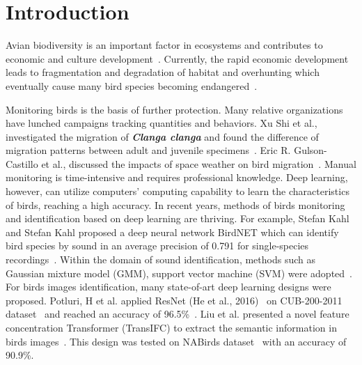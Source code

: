 \section{Introduction}
\newcommand{\textbi}[1]{\textit{\textbf{#1}}}
Avian biodiversity is an important factor 
in ecosystems and contributes to 
economic and culture development~\cite{bc1}. 
Currently, the rapid economic development leads to fragmentation and degradation of habitat and overhunting 
which eventually cause many bird species becoming endangered~\cite{bc1,bc2}. 

Monitoring birds is the basis of further protection.
Many relative organizations have lunched campaigns 
tracking quantities and behaviors. 
Xu Shi et al., investigated the migration of
\textbi{Clanga clanga} and found the difference of 
migration patterns between adult and juvenile specimens~\cite{bc3}.
Eric R. Gulson-Castillo et al., discussed the impacts 
of space weather on bird migration~\cite{bc4}.
Manual monitoring is time-intensive and requires professional knowledge.
Deep learning, however, can utilize computers' computing capability to learn the characteristics of birds, 
reaching a high accuracy.
In recent years, methods of birds monitoring and identification based on deep learning are 
thriving. For example, Stefan Kahl and Stefan Kahl  
proposed a deep neural network BirdNET which can 
identify bird species by sound in an average precision of 
0.791 for single-species recordings~\cite{sa1}.
Within the domain of sound identification, methods
such as Gaussian mixture model (GMM),  support vector machine (SVM)
were adopted~\cite{sa2,sa3}. For birds images identification, many state-of-art deep learning designs
were proposed. Potluri, H et al. applied ResNet (He et al., 2016)~\cite{resnet} on 
CUB-200-2011 dataset~\cite{dataset1} and reached an accuracy of 96.5\%~\cite{sa4}.
Liu et al. presented a novel feature concentration Transformer 
(TransIFC) to extract the semantic information in birds images~\cite{sa5}. 
This design was tested on NABirds dataset~\cite{dataset2} with an accuracy of 90.9\%.

